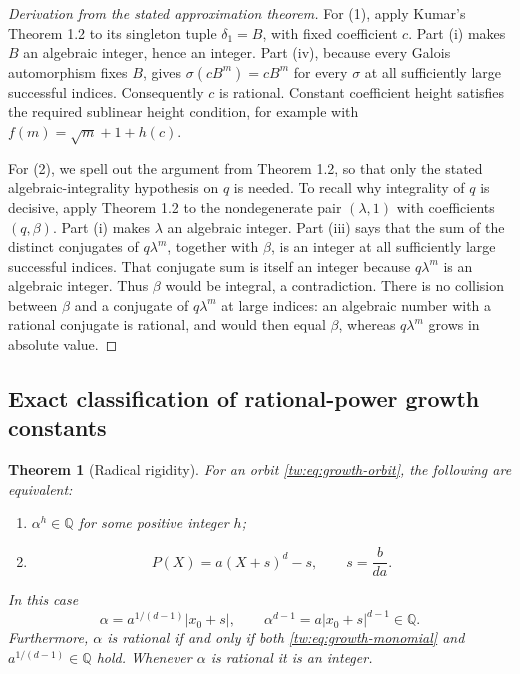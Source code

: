 \documentclass[11pt,a4paper]{article}
\newtheorem{theorem}{Theorem}[section]
\theoremstyle{definition}
\theoremstyle{remark}
\numberwithin{equation}{section}
\begin{document}
\begin{proof}[Derivation from the stated approximation theorem]
For (1), apply Kumar's Theorem 1.2 to its singleton tuple
$\delta_1=B$, with fixed coefficient $c$.  Part (i) makes $B$ an
algebraic integer, hence an integer.  Part (iv), because every Galois
automorphism fixes $B$, gives $\sigma(cB^m)=cB^m$ for every $\sigma$
at all sufficiently large successful indices.  Consequently $c$ is
rational.  Constant coefficient height satisfies the required sublinear
height condition, for example with $f(m)=\sqrt m+1+h(c)$.

For (2), we spell out the argument from Theorem 1.2, so that
only the stated algebraic-integrality hypothesis on $q$ is needed.  To recall why
integrality of $q$ is decisive, apply Theorem 1.2 to the nondegenerate
pair $(\lambda,1)$ with coefficients $(q,\beta)$.  Part (i) makes
$\lambda$ an algebraic integer.  Part (iii) says that the sum of the
distinct conjugates of $q\lambda^m$, together with $\beta$, is an
integer at all sufficiently large successful indices.  That conjugate
sum is itself an integer because $q\lambda^m$ is an algebraic integer.
Thus $\beta$ would be integral, a contradiction.  There is no collision
between $\beta$ and a conjugate of $q\lambda^m$ at large indices:
an algebraic number with a rational conjugate is rational, and would
then equal $\beta$, whereas $q\lambda^m$ grows in absolute value.
\end{proof}

\subsection{Exact classification of rational-power growth constants}

\begin{theorem}[Radical rigidity]\label{tw:thm:growth-radical}
For an orbit \eqref{tw:eq:growth-orbit}, the following are equivalent:
\begin{enumerate}
\item $\alpha^h\in\mathbb Q$ for some positive integer $h$;
\item
\begin{equation}\label{tw:eq:growth-monomial}
 P(X)=a(X+s)^d-s,\qquad s=\frac{b}{da}.
\end{equation}
\end{enumerate}
In this case
\begin{equation}\label{tw:eq:growth-radical-value}
 \alpha=a^{1/(d-1)}|x_0+s|,\qquad
 \alpha^{d-1}=a|x_0+s|^{d-1}\in\mathbb Q.
\end{equation}
Furthermore, $\alpha$ is rational if and only if both
\eqref{tw:eq:growth-monomial} and $a^{1/(d-1)}\in\mathbb Q$ hold.
Whenever $\alpha$ is rational it is an integer.
\end{theorem}
\end{document}
